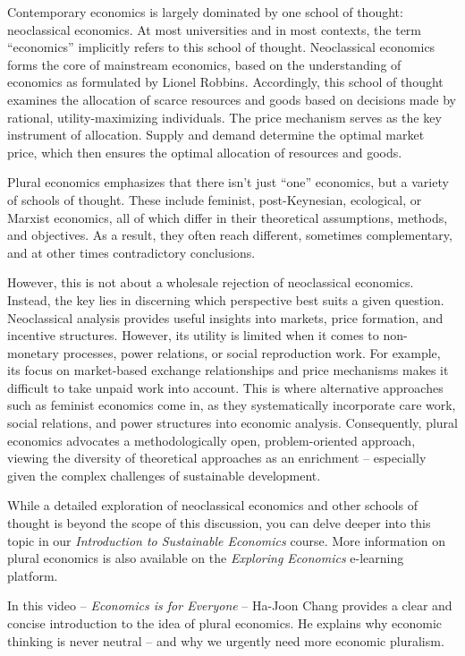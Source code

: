 \documentclass[
  a4paper,
  openany]{book}
\begin{document}
\begin{tcolorbox}[enhanced jigsaw, coltitle=black, bottomtitle=1mm, opacitybacktitle=0.6, titlerule=0mm, opacityback=0, leftrule=.75mm, colbacktitle=quarto-callout-note-color!10!white, bottomrule=.15mm, toptitle=1mm, breakable, title={Plural economics}, arc=.35mm, rightrule=.15mm, toprule=.15mm, left=2mm, colback=white, colframe=quarto-callout-note-color-frame]

Contemporary economics is largely dominated by one school of thought:
neoclassical economics. At most universities and in most contexts, the
term ``economics'' implicitly refers to this school of thought.
Neoclassical economics forms the core of mainstream economics, based on
the understanding of economics as formulated by Lionel Robbins.
Accordingly, this school of thought examines the allocation of scarce
resources and goods based on decisions made by rational,
utility-maximizing individuals. The price mechanism serves as the key
instrument of allocation. Supply and demand determine the optimal market
price, which then ensures the optimal allocation of resources and goods.

Plural economics emphasizes that there isn't just ``one'' economics, but
a variety of schools of thought. These include feminist, post-Keynesian,
ecological, or Marxist economics, all of which differ in their
theoretical assumptions, methods, and objectives. As a result, they
often reach different, sometimes complementary, and at other times
contradictory conclusions.

However, this is not about a wholesale rejection of neoclassical
economics. Instead, the key lies in discerning which perspective best
suits a given question. Neoclassical analysis provides useful insights
into markets, price formation, and incentive structures. However, its
utility is limited when it comes to non-monetary processes, power
relations, or social reproduction work. For example, its focus on
market-based exchange relationships and price mechanisms makes it
difficult to take unpaid work into account. This is where alternative
approaches such as feminist economics come in, as they systematically
incorporate care work, social relations, and power structures into
economic analysis. Consequently, plural economics advocates a
methodologically open, problem-oriented approach, viewing the diversity
of theoretical approaches as an enrichment -- especially given the
complex challenges of sustainable development.

While a detailed exploration of neoclassical economics and other schools
of thought is beyond the scope of this discussion, you can delve deeper
into this topic in our \emph{Introduction to Sustainable Economics}
course. More information on plural economics is also available on the
\emph{Exploring Economics} e-learning platform.

In this video -- \emph{Economics is for Everyone} -- Ha-Joon Chang
provides a clear and concise introduction to the idea of plural
economics. He explains why economic thinking is never neutral -- and why
we urgently need more economic pluralism.

\end{tcolorbox}
\end{document}
